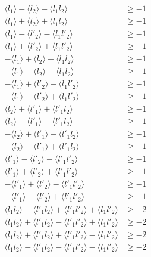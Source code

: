 \documentclass[10pt]{article}
\begin{document}
\begin{equation}
\begin{aligned}\label{eq:nonmodineq}
\langle l_1 \rangle - \langle l_2 \rangle - \langle l_1 l_2 \rangle &\geq -1\\
\langle l_1 \rangle + \langle l_2 \rangle + \langle l_1 l_2 \rangle &\geq -1\\
\langle l_1 \rangle - \langle l'_2 \rangle - \langle l_1 l'_2 \rangle &\geq -1\\
\langle l_1 \rangle + \langle l'_2 \rangle + \langle l_1 l'_2 \rangle &\geq -1\\
-\langle l_1 \rangle + \langle l_2 \rangle - \langle l_1 l_2 \rangle &\geq -1\\
-\langle l_1 \rangle - \langle l_2 \rangle + \langle l_1 l_2 \rangle &\geq -1\\
-\langle l_1 \rangle + \langle l'_2 \rangle - \langle l_1 l'_2 \rangle &\geq -1\\
-\langle l_1 \rangle - \langle l'_2 \rangle + \langle l_1 l'_2 \rangle &\geq -1\\
\langle l_2 \rangle + \langle l'_1 \rangle + \langle l'_1 l_2 \rangle &\geq -1\\
\langle l_2 \rangle - \langle l'_1 \rangle - \langle l'_1 l_2 \rangle &\geq -1\\
-\langle l_2 \rangle + \langle l'_1 \rangle - \langle l'_1 l_2 \rangle &\geq -1\\
-\langle l_2 \rangle - \langle l'_1 \rangle + \langle l'_1 l_2 \rangle &\geq -1\\
\langle l'_1 \rangle - \langle l'_2 \rangle - \langle l'_1 l'_2 \rangle &\geq -1\\
\langle l'_1 \rangle + \langle l'_2 \rangle + \langle l'_1 l'_2 \rangle &\geq -1\\
-\langle l'_1 \rangle + \langle l'_2 \rangle - \langle l'_1 l'_2 \rangle &\geq -1\\
-\langle l'_1 \rangle - \langle l'_2 \rangle + \langle l'_1 l'_2 \rangle &\geq -1\\
\langle l_1 l_2 \rangle - \langle l'_1 l_2 \rangle + \langle l'_1 l'_2 \rangle + \langle l_1 l'_2 \rangle &\geq -2\\
\langle l_1 l_2 \rangle + \langle l'_1 l_2 \rangle - \langle l'_1 l'_2 \rangle + \langle l_1 l'_2 \rangle &\geq -2\\
\langle l_1 l_2 \rangle + \langle l'_1 l_2 \rangle + \langle l'_1 l'_2 \rangle - \langle l_1 l'_2 \rangle &\geq -2\\
\langle l_1 l_2 \rangle - \langle l'_1 l_2 \rangle - \langle l'_1 l'_2 \rangle - \langle l_1 l'_2 \rangle &\geq -2\\

\end{aligned}
\end{equation}
\end{document}

